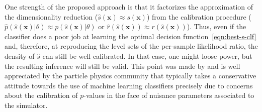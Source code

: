 \documentclass[12pt]{article}
\numberwithin{equation}{section}
\theoremstyle{plain}
\begin{document}

One strength of the proposed approach is that it factorizes the approximation of
the dimensionality reduction ($\hat{s}(\mathbf{x}) \approx s(\mathbf{x})$) from the
calibration procedure ($\hat p(\hat s(\mathbf{x})| \theta) \approx
p(\hat{s}(\mathbf{x})|\theta)$ or $\hat{r}(\hat{s}(\mathbf{x})) \approx r(\hat{s}(\mathbf{x}))$). Thus, even if the classifier does a poor job at
learning the optimal decision function~\ref{eqn:best-s-clf} and, therefore, at
reproducing the level sets of the per-sample likelihood ratio, the density of
$\hat{s}$ can still be well calibrated. In that case, one might loose power, but
the resulting inference will still be valid. This point was made by
\cite{Neal:2007zz} and is well appreciated by the particle physics community
that typically takes a conservative attitude towards the use of machine learning
classifiers precisely due to concerns about the calibration of $p$-values in the
face of nuisance parameters associated to the simulator.
\end{document}
